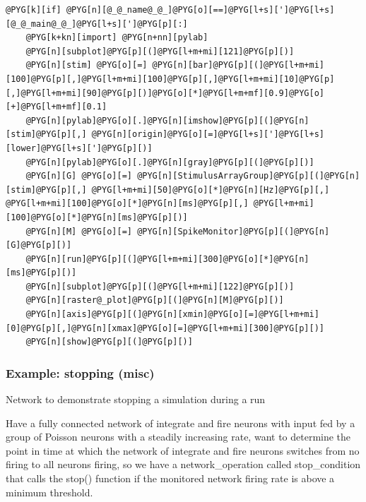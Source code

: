 \documentclass[letterpaper,10pt,english]{manual}
\begin{document}
\begin{Verbatim}[commandchars=@\[\]]
@PYG[k][if] @PYG[n][@_@_name@_@_]@PYG[o][==]@PYG[l+s][']@PYG[l+s][@_@_main@_@_]@PYG[l+s][']@PYG[p][:]
    @PYG[k+kn][import] @PYG[n+nn][pylab]
    @PYG[n][subplot]@PYG[p][(]@PYG[l+m+mi][121]@PYG[p][)]
    @PYG[n][stim] @PYG[o][=] @PYG[n][bar]@PYG[p][(]@PYG[l+m+mi][100]@PYG[p][,]@PYG[l+m+mi][100]@PYG[p][,]@PYG[l+m+mi][10]@PYG[p][,]@PYG[l+m+mi][90]@PYG[p][)]@PYG[o][*]@PYG[l+m+mf][0.9]@PYG[o][+]@PYG[l+m+mf][0.1]
    @PYG[n][pylab]@PYG[o][.]@PYG[n][imshow]@PYG[p][(]@PYG[n][stim]@PYG[p][,] @PYG[n][origin]@PYG[o][=]@PYG[l+s][']@PYG[l+s][lower]@PYG[l+s][']@PYG[p][)]
    @PYG[n][pylab]@PYG[o][.]@PYG[n][gray]@PYG[p][(]@PYG[p][)]
    @PYG[n][G] @PYG[o][=] @PYG[n][StimulusArrayGroup]@PYG[p][(]@PYG[n][stim]@PYG[p][,] @PYG[l+m+mi][50]@PYG[o][*]@PYG[n][Hz]@PYG[p][,] @PYG[l+m+mi][100]@PYG[o][*]@PYG[n][ms]@PYG[p][,] @PYG[l+m+mi][100]@PYG[o][*]@PYG[n][ms]@PYG[p][)]
    @PYG[n][M] @PYG[o][=] @PYG[n][SpikeMonitor]@PYG[p][(]@PYG[n][G]@PYG[p][)]
    @PYG[n][run]@PYG[p][(]@PYG[l+m+mi][300]@PYG[o][*]@PYG[n][ms]@PYG[p][)]
    @PYG[n][subplot]@PYG[p][(]@PYG[l+m+mi][122]@PYG[p][)]
    @PYG[n][raster@_plot]@PYG[p][(]@PYG[n][M]@PYG[p][)]
    @PYG[n][axis]@PYG[p][(]@PYG[n][xmin]@PYG[o][=]@PYG[l+m+mi][0]@PYG[p][,]@PYG[n][xmax]@PYG[o][=]@PYG[l+m+mi][300]@PYG[p][)]
    @PYG[n][show]@PYG[p][(]@PYG[p][)]
\end{Verbatim}

\resetcurrentobjects
\hypertarget{--doc-examples-misc_stopping}{}

\hypertarget{index-68}{}\subsubsection{Example: stopping (misc)}

Network to demonstrate stopping a simulation during a run

Have a fully connected network of integrate and fire neurons
with input fed by a group of Poisson neurons with a steadily
increasing rate, want to determine the point in time at which
the network of integrate and fire neurons switches from no
firing to all neurons firing, so we have a network\_operation
called stop\_condition that calls the stop() function if the
monitored network firing rate is above a minimum threshold.
\end{document}

